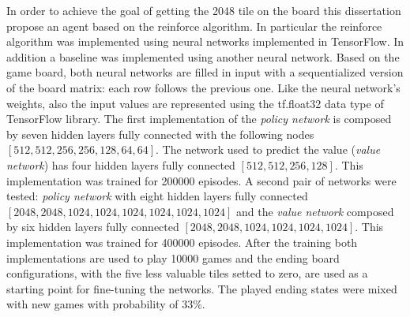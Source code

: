 In order to achieve the goal of getting the 2048 tile on the board this dissertation propose an agent based on the reinforce algorithm. In particular the reinforce algorithm \cite{reinforce} was implemented using neural networks implemented in TensorFlow. In addition a baseline was implemented using another neural network.
Based on the game board, both neural networks are filled in input with a sequentialized version of the board matrix: each row follows the previous one.
Like the neural network’s weights, also the input values are represented using the tf.float32 data type of TensorFlow library.
The first implementation \label{lab:first_net} of the \textit{policy network} is composed by seven hidden layers fully connected with the following nodes $[512,512,256,256,128, 64,64]$. The network used to predict the value (\textit{value network}) has four hidden layers fully connected $[512,512,256,128]$.
This implementation was trained for 200000 episodes.
A second \label{lab:second_net} pair of networks were tested: \textit{policy network} with eight hidden layers fully connected $[2048,2048,1024, 1024, 1024, 1024, 1024, 1024]$ and the \textit{value network} composed by six hidden layers fully connected $[2048,2048,1024, 1024, 1024, 1024]$.
This implementation was trained for 400000 episodes.
After the training both implementations are used to play 10000 games\label{lab:replay} and the ending board configurations, with the five less valuable tiles setted to zero, are used as a starting point for fine-tuning the networks. The played ending states were mixed with new games with probability of 33\%.
